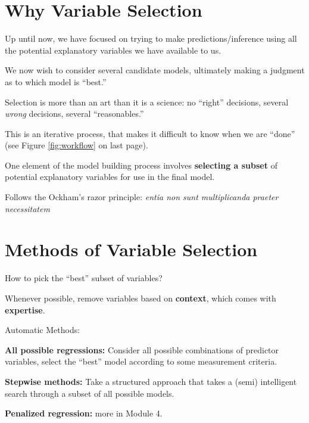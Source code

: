 \documentclass[12pt]{../notes}
\begin{document}

\section{Why Variable Selection}
\bi
\item Up until now, we have focused on trying to make predictions/inference using all the potential explanatory variables we have available to us. 
\item We now wish to consider several candidate models, ultimately making a judgment as to which model is ``best.''
\bi
\item Selection is more than an art than it is a science: no ``right'' decisions, several \textit{wrong} decisions, several ``reasonables.''
\item This is an iterative process, that makes it difficult to know when we are ``done'' (see Figure \ref{fig:workflow} on last page). 
\ei
\item One element of the model building process involves \textbf{selecting a subset} of potential explanatory variables for use in the final model. 
\bi
\item Follows the Ockham's razor principle:  \emph{entia non sunt multiplicanda praeter necessitatem}
\ei
\begin{minipage}[l][2cm][c]{0.8\textwidth}
\end{minipage}
\ei

\section{Methods of Variable Selection}
How to pick the ``best'' subset of variables? 
\bi
\item Whenever possible, remove variables based on \textbf{context}, which comes with \textbf{expertise}.
\item Automatic Methods:
\bi
\item \textbf{All possible regressions:} Consider all possible combinations of predictor variables, select the ``best'' model according to some measurement criteria.  
\item \textbf{Stepwise methods:} Take a structured approach that takes a (semi) intelligent search through a subset of all possible models. 
\item \textbf{Penalized regression:} more in Module 4. 
\ei 
\ei
\end{document}
